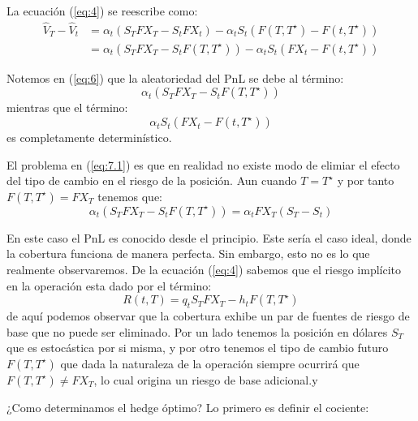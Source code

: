\documentclass[12pt]{article}
\begin{document}
La ecuación (\ref{eq:4}) se reescribe como:
\begin{equation}
\begin{split}
            \hat{V}_T - \hat{V}_t  & = \alpha_t\left(S_TFX_T - S_tFX_t\right) - \alpha_tS_t\left(F(T, T^\star) - F(t, T^\star)\right) \\
            & = \alpha_t\left(S_TFX_T - S_tF(T, T^\star)\right) - \alpha_tS_t\left(FX_t - F(t, T^\star)\right)
\end{split}
        \label{eq:6}
\end{equation}

 Notemos en (\ref{eq:6}) que  la aleatoriedad del PnL se debe al término:
 \begin{equation}
    \alpha_t\left(S_TFX_T - S_tF(T, T^\star)\right)    
    \label{eq:7.1}
 \end{equation}
 mientras que el término:
 \begin{equation}
     \alpha_tS_t\left(FX_t - F(t, T^\star)\right)
     \label{eq:7.2}
 \end{equation}
 es completamente determinístico.
 
El problema en (\ref{eq:7.1})  es que en realidad no existe modo de elimiar el efecto del tipo de cambio en el riesgo de la posición. Aun cuando  $T = T^\star$ y por tanto $F(T, T^\star) = FX_T$ tenemos que:
 \begin{equation}
     \alpha_t\left(S_TFX_T - S_tF(T, T^\star)\right) = \alpha_tFX_T\left(S_T - S_t\right) 
     \label{eq:7.3}
 \end{equation}

En este caso el PnL es conocido desde el principio. Este sería el caso ideal, donde la cobertura funciona de manera perfecta. Sin embargo, esto no es lo que realmente observaremos. De la ecuación (\ref{eq:4}) sabemos que el riesgo implícito en la operación esta dado por el término:
\begin{equation}
    R(t, T) =  q_tS_TFX_T - h_tF(T, T^\star)
\end{equation}
de aquí podemos  observar que la cobertura  exhibe un par de fuentes de riesgo de base que no puede ser eliminado. Por un lado tenemos la posición en dólares $S_T$ que es estocástica por si misma, y por otro tenemos el tipo de cambio futuro $F(T,T^\star)$ que dada la naturaleza de la operación siempre ocurrirá que $F(T,T^\star) \neq FX_T$, lo cual origina un riesgo de base adicional.y

¿Como determinamos el hedge óptimo? Lo primero es definir el cociente:
\end{document}
